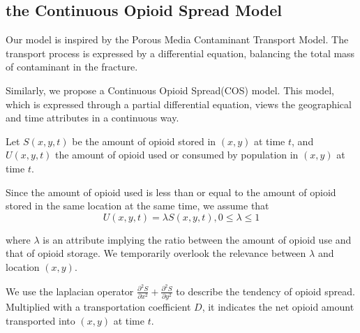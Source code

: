 \subsection{the Continuous Opioid Spread Model}
Our model is inspired by the Porous Media Contaminant Transport Model.\cite{8} The transport process is expressed by a differential equation, balancing the total mass of contaminant in the fracture. 

Similarly, we propose a Continuous Opioid Spread(COS) model. This model, which is expressed through a partial differential equation, views the geographical and time attributes in a continuous way. 

Let $S(x,y,t)$ be the amount of opioid stored in $(x,y)$ at time $t$, and $U(x,y,t)$ the amount of opioid used or consumed by population in $(x,y)$ at time $t$.
\begin{comment}
, and $F(x,y,t)$ as the amount of drugs identified in $(x,y)$ at time $t$. We assume that the amount of identified drugs is directly proportional to the total amount of drugs with a proportionality constant $k$, such that

The NFLIS data contains opioid identification counts in years 2010-2017 for narcotic analgesics and heroin in each of the counties from the five states stated in the problem background section. We denote this data as $F(x,y,t)$, the amount of drugs identified in $(x,y)$ at time $t$. 

\begin{equation}
S(x,y,t) = k F(x,y,t)
\end{equation}
\end{comment}
Since the amount of opioid used is less than or equal to the amount of opioid stored in the same location at the same time, we assume that
\begin{equation}
U(x,y,t) = \lambda S(x,y,t), 0\leq \lambda \leq 1
\end{equation}

where $\lambda$ is an attribute implying the ratio between the amount of opioid use and that of opioid storage. We temporarily overlook the relevance between $\lambda$ and location $(x,y)$.


We use the laplacian operator $\frac{\partial^2 S}{\partial x^2} + \frac{\partial^2 S}{\partial y^2}$ to describe the tendency of opioid spread. Multiplied with a transportation coefficient $D$, it indicates the net opioid amount transported into $(x,y)$ at time $t$.

